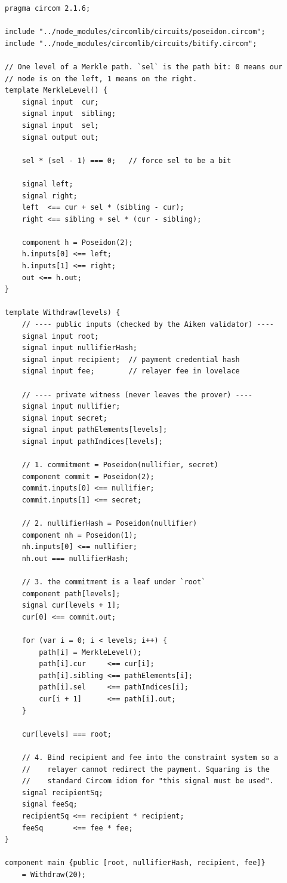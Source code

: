 \begin{verbatim}
pragma circom 2.1.6;

include "../node_modules/circomlib/circuits/poseidon.circom";
include "../node_modules/circomlib/circuits/bitify.circom";

// One level of a Merkle path. `sel` is the path bit: 0 means our
// node is on the left, 1 means on the right.
template MerkleLevel() {
    signal input  cur;
    signal input  sibling;
    signal input  sel;
    signal output out;

    sel * (sel - 1) === 0;   // force sel to be a bit

    signal left;
    signal right;
    left  <== cur + sel * (sibling - cur);
    right <== sibling + sel * (cur - sibling);

    component h = Poseidon(2);
    h.inputs[0] <== left;
    h.inputs[1] <== right;
    out <== h.out;
}

template Withdraw(levels) {
    // ---- public inputs (checked by the Aiken validator) ----
    signal input root;
    signal input nullifierHash;
    signal input recipient;  // payment credential hash
    signal input fee;        // relayer fee in lovelace

    // ---- private witness (never leaves the prover) ----
    signal input nullifier;
    signal input secret;
    signal input pathElements[levels];
    signal input pathIndices[levels];

    // 1. commitment = Poseidon(nullifier, secret)
    component commit = Poseidon(2);
    commit.inputs[0] <== nullifier;
    commit.inputs[1] <== secret;

    // 2. nullifierHash = Poseidon(nullifier)
    component nh = Poseidon(1);
    nh.inputs[0] <== nullifier;
    nh.out === nullifierHash;

    // 3. the commitment is a leaf under `root`
    component path[levels];
    signal cur[levels + 1];
    cur[0] <== commit.out;

    for (var i = 0; i < levels; i++) {
        path[i] = MerkleLevel();
        path[i].cur     <== cur[i];
        path[i].sibling <== pathElements[i];
        path[i].sel     <== pathIndices[i];
        cur[i + 1]      <== path[i].out;
    }

    cur[levels] === root;

    // 4. Bind recipient and fee into the constraint system so a
    //    relayer cannot redirect the payment. Squaring is the
    //    standard Circom idiom for "this signal must be used".
    signal recipientSq;
    signal feeSq;
    recipientSq <== recipient * recipient;
    feeSq       <== fee * fee;
}

component main {public [root, nullifierHash, recipient, fee]}
    = Withdraw(20);
\end{verbatim}

